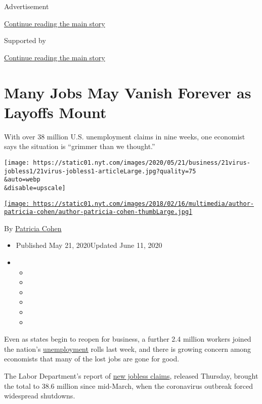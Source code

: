 Advertisement

\protect\hyperlink{after-top}{Continue reading the main story}

Supported by

\protect\hyperlink{after-sponsor}{Continue reading the main story}

\hypertarget{many-jobs-may-vanish-forever-as-layoffs-mount}{%
\section{Many Jobs May Vanish Forever as Layoffs
Mount}\label{many-jobs-may-vanish-forever-as-layoffs-mount}}

With over 38 million U.S. unemployment claims in nine weeks, one
economist says the situation is ``grimmer than we thought.''

\texttt{[image: https://static01.nyt.com/images/2020/05/21/business/21virus-jobless1/21virus-jobless1-articleLarge.jpg?quality=75\\\&auto=webp\\\&disable=upscale]}

\href{https://www.nytimes.com/by/patricia-cohen}{\texttt{[image: https://static01.nyt.com/images/2018/02/16/multimedia/author-patricia-cohen/author-patricia-cohen-thumbLarge.jpg]}}

By \href{https://www.nytimes.com/by/patricia-cohen}{Patricia Cohen}

\begin{itemize}
\item
  Published May 21, 2020Updated June 11, 2020
\item
  \begin{itemize}
  \item
  \item
  \item
  \item
  \item
  \item
  \end{itemize}
\end{itemize}

Even as states begin to reopen for business, a further 2.4 million
workers joined the nation's
\href{https://www.nytimes.com/2020/06/11/business/economy/unemployment-claims-coronavirus.html}{unemployment}
rolls last week, and there is growing concern among economists that many
of the lost jobs are gone for good.

The Labor Department's report of
\href{https://www.nytimes.com/2020/06/04/business/economy/coronavirus-unemployment-claims.html}{new
jobless claims}, released Thursday, brought the total to 38.6 million
since mid-March, when the coronavirus outbreak forced widespread
shutdowns.


